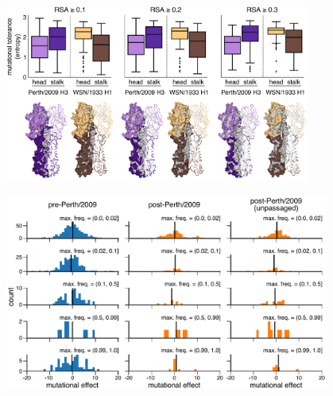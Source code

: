 \documentclass[9pt,twocolumn,twoside]{pnas-new}
\providecommand{\DIFaddend}{} %
\begin{document}
\begin{suppfigure}[H]
\DIFaddend \centerline{\includegraphics[width=0.75\textwidth]{figs/supp_head_stalk_RSA/head_stalk_RSA.pdf}}
\caption{\label{suppfig:head_stalk_RSA}
{\bf Mutational tolerances of the head and stalk domains at various relative solvent accessibility cutoffs.}
The mutational tolerances of the head and stalk domains show less disparity for the Perth/2009 H3 HA compared to those for the WSN/1933 H1 HA.
We used relative solvent accessibility (RSA) cutoffs of $0.1$, $0.2$, and $0.3$ to define solvent-exposed residues and plotted the mutational tolerances (Shannon entropy of re-scaled preferences) of these residues in the head and stalk domains for the Perth/2009 H3 HA (purple) and the WSN/1933 H1 HA (brown).
Residues falling in between the two cysteines at sites 52 and 277 were defined as belonging to the head domain, while all other residues were defined as the stalk domain.
The HA structures color the residues that are defined as solvent exposed at a given RSA cutoff.
One monomer is shown in surface representation and another monomer shown in ribbon representation.
Residues in lighter shades of purple or brown are in the head domain, while residues in darker shades are in the stalk domain.
Note that the mutational tolerance values are not comparable between the two HAs.
}
\end{suppfigure}

\begin{suppfigure}[H]
\centerline{\includegraphics[width=0.8\textwidth]{figs/supp_muteffect_maxfreq_WSN/muteffect_maxfreq_WSN_supp.pdf}}
\caption{\label{suppfig:muteffect_maxfreq_WSN_supp}
{\bf The distribution of mutational effects measured in H1 HA among H3N2 mutations binned by the maximum frequency that they reach.}
This figure repeats the analysis of the H3N2 mutation frequencies in Figure~\ref{fig:muteffect_maxfreq}B, but uses the deep mutational scanning data for an H1 HA as measured in \cite{doud2016accurate}.
}
\end{suppfigure}
\end{document}
